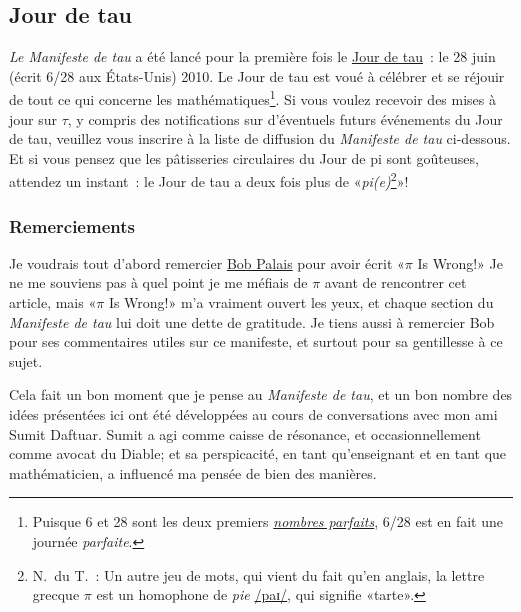   \subsection{Jour de tau} %
  \label{sec:tau_day}

\emph{Le Manifeste de tau} a été lancé pour la première fois le
\href{https://tauday.com/}{Jour de tau}~: le 28 juin (écrit 6/28 aux États-Unis)
2010. Le Jour de tau est voué à célébrer et se réjouir de tout ce qui
concerne les mathématiques\ns\footnote{Puisque 6 et 28 sont les deux premiers
\href{https://fr.wikipedia.org/wiki/Nombre_parfait}{\emph{nombres parfaits}},
6/28 est en fait une journée \emph{parfaite}.}. Si vous voulez recevoir des
mises à jour sur $\tau$, y compris des notifications sur d'éventuels futurs événements
du Jour de tau, veuillez vous inscrire à la liste de diffusion du
\emph{Manifeste de tau} ci-dessous. Et si vous pensez que les pâtisseries
circulaires du Jour de pi sont goûteuses, attendez un instant~: le Jour de tau a
deux fois plus de «\ns \emph{pi(e)}\ns\footnote{N.\ du T.~: Un autre jeu de mots,
qui vient du fait qu'en anglais, la lettre grecque $\pi$ est un
homophone de \emph{pie}
\href{https://fr.wikipedia.org/wiki/Alphabet_phonétique_international}{/paɪ/},
qui signifie «\ns tarte\ns ».}\ns »\ns!


  \subsubsection{Remerciements} %
  \label{sec:acknowledgments}

Je voudrais tout d'abord remercier
\href{https://translate.google.com/translate?hl=en&sl=en&tl=fr&u=https://www.math.utah.edu/~palais/}{Bob
Palais} pour avoir écrit «\ns $\pi$ Is Wrong!\ns » Je ne me souviens pas à quel point
je me méfiais de $\pi$ avant de rencontrer cet article, mais
«\ns $\pi$ Is Wrong!\ns » m'a vraiment ouvert les yeux, et chaque section du
\emph{Manifeste de tau} lui doit une dette de gratitude. Je tiens aussi à
remercier Bob pour ses commentaires utiles sur ce manifeste, et surtout pour sa
gentillesse à ce sujet.

Cela fait un bon moment que je pense au \emph{Manifeste de tau}, et un bon
nombre des idées présentées ici ont été développées au cours de conversations
avec mon ami Sumit Daftuar. Sumit a agi comme caisse de résonance, et occasionnellement
comme avocat du Diable\ns; et sa perspicacité, en tant qu'enseignant et en tant que mathématicien, a
influencé ma pensée de bien des manières.

